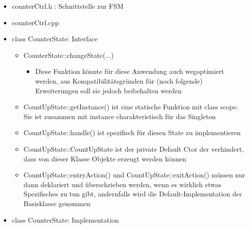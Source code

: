 \begin{itemize}
      \item counterCtrl.h : Schnittstelle zur FSM
            

      \item counterCtrl.cpp
            

      \item class CounterState: Interface
            
            \begin{itemize}
                  \item CounterState::changeState(...)
                        \begin{itemize}
                              \item Diese Funktion könnte für diese Anwendung auch wegoptimiert werden, aus Kompatibilitätsgründen für (noch folgende) Erweiterungen soll sie jedoch beibehalten werden
                        \end{itemize}
                  \item CountUpState::getInstance() ist eine statische Funktion mit class scope. Sie ist zusammen mit instance charakteristisch für das Singleton
                  \item CountUpState::handle() ist spezifisch für diesen State zu implementieren
                  \item CountUpState::CountUpState ist der private Default Ctor der verhindert, dass von dieser Klasse Objekte erzeugt werden können
                  \item CountUpState::entryAction() und CountUpState::exitAction() müssen nur dann deklariert und überschrieben werden, wenn es wirklich etwas Spezifisches zu tun gibt, andernfalls wird die Default-Implementation der Basisklasse genommen
            \end{itemize}
      \item class CounterState: Implementation
            
\end{itemize}

